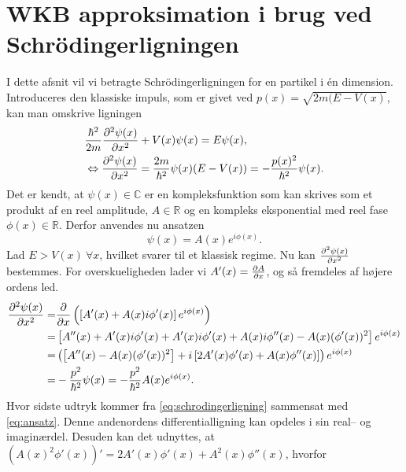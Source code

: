 
\section{WKB approksimation i brug ved Schrödingerligningen}
I dette afsnit vil vi betragte Schrödingerligningen for en partikel i én dimension. Introduceres den klassiske impuls, som er givet ved $p(x) = \sqrt{2m(E-V(x)}$, kan man omskrive ligningen
%
\begin{align}
    & \frac{\hbar^2}{2m} \pdiff[2]{\psi(x)}{x} + V(x)\psi(x) = E\psi(x), \\
    & \Leftrightarrow \pdiff[2]{\psi(x)}{x} = \frac{2m}{\hbar^2}\psi(x)(E - V(x))  = - \frac{p(x)^2}{\hbar^2}\psi(x).
    \label{eq:schrodingerligning}
\end{align}
%
Det er kendt, at $\psi(x) \in \mathbb{C}$ er en kompleksfunktion som kan skrives som et produkt af en reel amplitude, $A \in \mathbb{R}$ og en kompleks eksponential med reel fase $\phi(x)\in \mathbb{R}$. Derfor anvendes nu ansatzen
\begin{equation}
    \psi(x) = A(x) e^{i \phi(x)}.
    \label{eq:ansatz}
\end{equation}
Lad $E > V(x) \ \forall x$, hvilket svarer til et klassisk regime.
Nu kan $\pdiff[2]{\psi(x)}{x}$ bestemmes. For overskueligheden lader vi $A'(x) = \pdiff{A}{x}$, og så fremdeles af højere ordens led.
\begin{align}
    \pdiff[2]{\psi(x)}{x} = & \pdiff{}{x}\left( \left[ A'(x) + A(x)i\phi'(x) \right]e^{i\phi(x)} \right) \\
    = & \left[ A''(x) + A'(x)i\phi'(x) + A'(x)i\phi'(x) + A(x)i\phi''(x) - A(x)( \phi'(x))^2\right]e^{i\phi(x)} \\
    = & \left(\left[ A''(x) - A(x)(\phi'(x))^2\right] + i \left[2A'(x)\phi'(x) + A(x)\phi''(x) \right]\right)e^{i\phi(x)}\\
    = & -\frac{p^2}{\hbar^2}\psi(x) = -\frac{p^2}{\hbar^2} A(x)e^{i\phi(x)}.
    \label{eq:regime}
\end{align}
Hvor sidste udtryk kommer fra \cref{eq:schrodingerligning} sammensat med \cref{eq:ansatz}.
Denne andenordens differentialligning kan opdeles i sin real-- og imaginærdel. Desuden kan det udnyttes, at $\left( A(x)^2\phi'(x) \right)' = 2A'(x)\phi'(x) + A^2(x)\phi''(x)$, hvorfor


